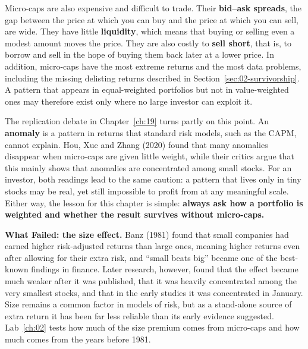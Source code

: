 Micro-caps are also expensive and difficult to trade. Their \textbf{bid--ask spreads}, the gap between the price at which you can buy and the price at which you can sell, are wide. They have little \textbf{liquidity}, which means that buying or selling even a modest amount moves the price. They are also costly to \textbf{sell short}, that is, to borrow and sell in the hope of buying them back later at a lower price. In addition, micro-caps have the most extreme returns and the most data problems, including the missing delisting returns described in Section~\ref{sec:02-survivorship}. A pattern that appears in equal-weighted portfolios but not in value-weighted ones may therefore exist only where no large investor can exploit it.

The replication debate in Chapter~\ref{ch:19} turns partly on this point. An \textbf{anomaly} is a pattern in returns that standard risk models, such as the CAPM, cannot explain. Hou, Xue and Zhang (2020) found that many anomalies disappear when micro-caps are given little weight, while their critics argue that this mainly shows that anomalies are concentrated among small stocks. For an investor, both readings lead to the same caution: a pattern that lives only in tiny stocks may be real, yet still impossible to profit from at any meaningful scale. Either way, the lesson for this chapter is simple: \textbf{always ask how a portfolio is weighted and whether the result survives without micro-caps.}

\begin{callout}
\textbf{What Failed: the size effect.} Banz (1981) found that small companies had earned higher risk-adjusted returns than large ones, meaning higher returns even after allowing for their extra risk, and ``small beats big'' became one of the best-known findings in finance. Later research, however, found that the effect became much weaker after it was published, that it was heavily concentrated among the very smallest stocks, and that in the early studies it was concentrated in January. Size remains a common factor in models of risk, but as a stand-alone source of extra return it has been far less reliable than its early evidence suggested. Lab~\ref{ch:02} tests how much of the size premium comes from micro-caps and how much comes from the years before 1981.
\end{callout}

